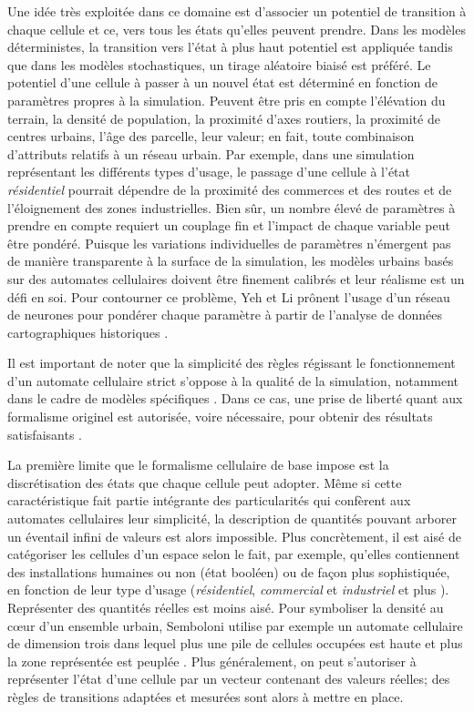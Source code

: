 \documentclass[10pt]{article}
\begin{document}
Une idée très exploitée dans ce domaine est d'associer un potentiel de
transition à chaque cellule et ce, vers tous les états qu'elles
peuvent prendre. Dans les modèles déterministes, la transition vers
l'état à plus haut potentiel est appliquée tandis que dans les modèles
stochastiques, un tirage aléatoire biaisé est préféré. Le potentiel
d'une cellule à passer à un nouvel état est déterminé en fonction de
paramètres propres à la simulation. Peuvent être pris en compte
l'élévation du terrain, la densité de population, la proximité d'axes
routiers, la proximité de centres urbains, l'âge des parcelle, leur
valeur; en fait, toute combinaison d'attributs relatifs à un réseau
urbain. Par exemple, dans une simulation représentant les différents
types d'usage, le passage d'une cellule à l'état \textit{résidentiel}
pourrait dépendre de la proximité des commerces et des routes et de
l'éloignement des zones industrielles. Bien sûr, un nombre élevé de
paramètres à prendre en compte requiert un couplage fin et l'impact de
chaque variable peut être pondéré. Puisque les variations
individuelles de paramètres n'émergent pas de manière transparente à
la surface de la simulation, les modèles urbains basés sur des
automates cellulaires doivent être finement calibrés et leur réalisme
est un défi en soi. Pour contourner ce problème, Yeh et Li prônent
l'usage d'un réseau de neurones pour pondérer chaque paramètre à
partir de l'analyse de données cartographiques historiques
\cite{Yeh2002}.

Il est important de noter que la simplicité des règles régissant le
fonctionnement d'un automate cellulaire strict s'oppose à la qualité
de la simulation, notamment dans le cadre de modèles spécifiques
\cite{Torrens2001}. Dans ce cas, une prise de liberté quant aux
formalisme originel est autorisée, voire nécessaire, pour obtenir des
résultats satisfaisants \cite{White1998}.

La première limite que le formalisme cellulaire de base impose est la
discrétisation des états que chaque cellule peut adopter. Même si
cette caractéristique fait partie intégrante des particularités qui
confèrent aux automates cellulaires leur simplicité, la description de
quantités pouvant arborer un éventail infini de valeurs est alors
impossible. Plus concrètement, il est aisé de catégoriser les cellules
d'un espace selon le fait, par exemple, qu'elles contiennent des
installations humaines ou non (état booléen)
\cite{Benguigui2004,Cornu} ou de façon plus sophistiquée, en fonction
de leur type d'usage (\textit{résidentiel}, \textit{commercial} et
\textit{industriel} \cite{Lechner} et plus
\cite{Dubos-Paillard203}). Représenter des quantités réelles est moins
aisé. Pour symboliser la densité au c\oe ur d'un ensemble urbain,
Semboloni utilise par exemple un automate cellulaire de dimension
trois dans lequel plus une pile de cellules occupées est haute et plus
la zone représentée est peuplée \cite{Semboloni2000}. Plus
généralement, on peut s'autoriser à représenter l'état d'une cellule
par un vecteur contenant des valeurs réelles; des règles de
transitions adaptées et mesurées sont alors à mettre en place.
\end{document}
